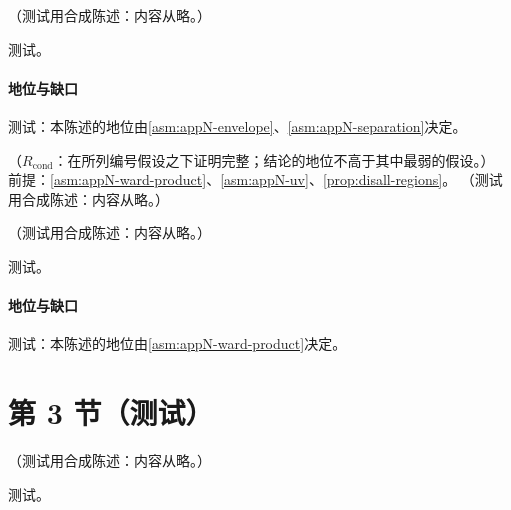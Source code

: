 \begin{proposition}\label{prop:disall-regions}
（测试用合成陈述：内容从略。）
\end{proposition}
\begin{proofsketch}测试。\end{proofsketch}
\paragraph{地位与缺口}测试：本陈述的地位由\cref{asm:appN-envelope}、\cref{asm:appN-separation}决定。

\begin{proposition}\label{prop:disall-factorized-subtraction}
（$R_{\mathrm{cond}}$：在所列编号假设之下证明完整；结论的地位不高于其中最弱的假设。）
前提：\cref{asm:appN-ward-product}、\cref{asm:appN-uv}、\cref{prop:disall-regions}。
（测试用合成陈述：内容从略。）
\end{proposition}

\begin{proposition}\label{prop:disall-h2}
（测试用合成陈述：内容从略。）
\end{proposition}
\begin{proofsketch}测试。\end{proofsketch}
\paragraph{地位与缺口}测试：本陈述的地位由\cref{asm:appN-ward-product}决定。

\section{第 3 节（测试）}\label{sec:disall-subtraction}

\begin{proposition}\label{prop:disall-h3h4}
（测试用合成陈述：内容从略。）
\end{proposition}
\begin{proofsketch}测试。\end{proofsketch}
